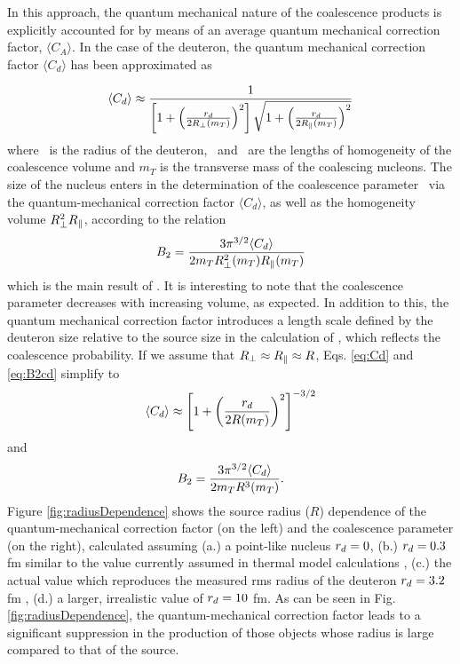 \documentclass[a4paper,11pt]{scrartcl} %
\begin{document}
In this approach, the quantum mechanical nature of the coalescence products is explicitly accounted for by means of an average quantum mechanical correction factor, $\langle C_{A} \rangle$. In the case of the deuteron, the quantum mechanical correction factor $\langle C_{d} \rangle$ has been approximated as 

\begin{equation}
\langle C_{d} \rangle \approx \frac{1}{\left[1+ \left(\frac{r_{d}}{2R_{\perp}(m_{T})}\right)^{2}\right] \sqrt{1+ \left(\frac{r_{d}}{2R_{\|}(m_{T})}\right)^{2}}}
\label{eq:Cd}
\end{equation}
%
where \dradius~is the radius of the deuteron, \rperp~and \rpar~are the lengths of homogeneity of the coalescence volume and $m_{T}$ is the transverse mass of the coalescing nucleons.
The size of the nucleus enters in the determination of the coalescence parameter \btwo~via the quantum-mechanical correction factor $\langle C_{d} \rangle$, as well as the homogeneity volume $R_{\perp}^{2}R_{\|}$, according to the relation
%
\begin{equation}
B_{2} = \frac{3\pi^{3/2} \langle C_{d} \rangle}{2m_{T}R_{\perp}^{2}(m_{T})R_{\|}(m_{T})}
\label{eq:B2cd}
\end{equation}
%
which is the main result of \cite{Scheibl:1998tk}. It is interesting to note that the coalescence parameter decreases with increasing volume, as expected. In addition to this, the quantum mechanical correction factor introduces a length scale defined by the deuteron size relative to the source size in the calculation of \btwo, which reflects the coalescence probability. 
If we assume that  $R_{\perp} \approx R_{\|} \approx R$, Eqs. \ref{eq:Cd} and \ref{eq:B2cd} simplify to 
\begin{equation}
\langle C_{d} \rangle \approx \left[1+ \left(\frac{r_{d}}{2R(m_{T})}\right)^{2}\right]^{-3/2}
\label{eq:Cdapprox}
\end{equation}
%
and
%
\begin{equation}
B_{2} = \frac{3\pi^{3/2} \langle C_{d} \rangle}{2m_{T}R^{3}(m_{T})}.
\label{eq:B2approx}
\end{equation}
%
Figure \ref{fig:radiusDependence} shows the source radius ($R$) dependence of the quantum-mechanical correction factor (on the left) and the coalescence parameter \btwo (on the right), calculated assuming (a.) a point-like nucleus $r_{d} = 0$, (b.) $r_{d} = 0.3$ fm similar to the value currently assumed in thermal model calculations \cite{Andronic:2016nof}, (c.) the actual value which reproduces the measured rms radius of the deuteron $r_{d} = 3.2$ fm \cite{Mohr:2015ccw}, (d.) a larger, irrealistic value of  $r_{d} = 10$ fm. 
As can be seen in Fig. \ref{fig:radiusDependence}, the quantum-mechanical correction factor leads to a significant suppression in the production of those objects whose radius is large compared to that of the source.
\end{document}
